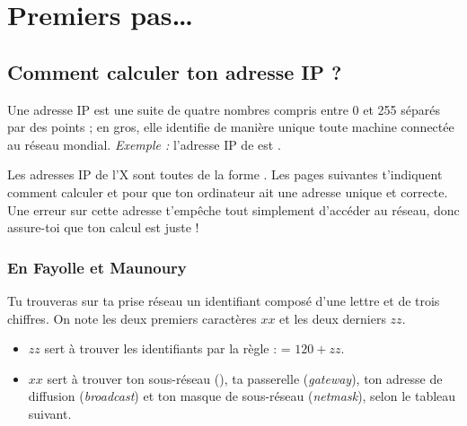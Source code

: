 \section{Premiers pas\ldots}

\subsection{Comment calculer ton adresse IP ?}

\label{calcul_ip}

Une adresse IP est une suite de quatre nombres compris entre 0 et
255 s\'epar\'es par des points ; en gros, elle identifie de mani\`ere
unique toute machine connect\'ee au r\'eseau mondial. \emph{Exemple :}
l'adresse IP de  est .

Les adresses IP de l'X sont toutes de la forme .
Les pages suivantes t'indiquent comment calculer  et  pour que ton
ordinateur ait une adresse unique et correcte. Une erreur sur cette adresse t'emp\^eche tout simplement d'acc\'eder au r\'eseau, donc assure-toi que ton calcul est juste !


\subsubsection{En Fayolle et Maunoury}
Tu trouveras sur ta prise r\'eseau un identifiant compos\'e d'une lettre et de trois chiffres.
On note les deux premiers caract\`eres $xx$ et les deux derniers $zz$.
\begin{itemize}
\item $zz$ sert \`a trouver les identifiants  par la r\`egle :  = $120 + zz$.

\item $xx$ sert \`a trouver ton sous-r\'eseau (), ta passerelle (\emph{gateway}),
ton adresse de diffusion (\emph{broadcast}) et ton masque de sous-réseau (\emph{netmask}), selon le tableau suivant.
\end{itemize}


